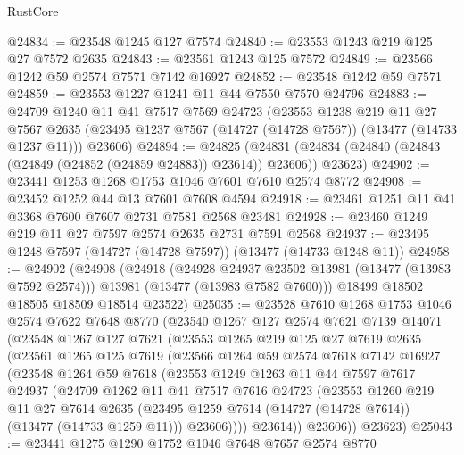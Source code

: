 \begin{lexlean}{RustCore}
\begin{coremodule}
@24834 := @23548 @1245 @127 @7574
@24840 := @23553 @1243 @219 @125 @27 @7572 @2635
@24843 := @23561 @1243 @125 @7572
@24849 := @23566 @1242 @59 @2574 @7571 @7142 @16927
@24852 := @23548 @1242 @59 @7571
@24859 := @23553 @1227 @1241 @11 @44 @7550 @7570 @24796
@24883 := @24709
    @1240
    @11
    @41
    @7517
    @7569
    @24723
    (@23553
      @1238
      @219
      @11
      @27
      @7567
      @2635
      (@23495 @1237 @7567 (@14727 (@14728 @7567)) (@13477 (@14733 @1237 @11)))
      @23606)
@24894 := @24825
    (@24831 (@24834 (@24840 (@24843 (@24849 (@24852 (@24859 @24883)) @23614)) @23606)) @23623)
@24902 := @23441 @1253 @1268 @1753 @1046 @7601 @7610 @2574 @8772
@24908 := @23452 @1252 @44 @13 @7601 @7608 @4594
@24918 := @23461 @1251 @11 @41 @3368 @7600 @7607 @2731 @7581 @2568 @23481
@24928 := @23460 @1249 @219 @11 @27 @7597 @2574 @2635 @2731 @7591 @2568
@24937 := @23495 @1248 @7597 (@14727 (@14728 @7597)) (@13477 (@14733 @1248 @11))
@24958 := @24902
    (@24908
      (@24918
        (@24928 @24937 @23502 @13981 (@13477 (@13983 @7592 @2574)))
        @13981
        (@13477 (@13983 @7582 @7600)))
      @18499
      @18502
      @18505
      @18509
      @18514
      @23522)
@25035 := @23528
    @7610
    @1268
    @1753
    @1046
    @2574
    @7622
    @7648
    @8770
    (@23540
      @1267
      @127
      @2574
      @7621
      @7139
      @14071
      (@23548
        @1267
        @127
        @7621
        (@23553
          @1265
          @219
          @125
          @27
          @7619
          @2635
          (@23561
            @1265
            @125
            @7619
            (@23566
              @1264
              @59
              @2574
              @7618
              @7142
              @16927
              (@23548
                @1264
                @59
                @7618
                (@23553
                  @1249
                  @1263
                  @11
                  @44
                  @7597
                  @7617
                  @24937
                  (@24709
                    @1262
                    @11
                    @41
                    @7517
                    @7616
                    @24723
                    (@23553
                      @1260
                      @219
                      @11
                      @27
                      @7614
                      @2635
                      (@23495 @1259 @7614 (@14727 (@14728 @7614)) (@13477 (@14733 @1259 @11)))
                      @23606))))
              @23614))
          @23606))
      @23623)
@25043 := @23441 @1275 @1290 @1752 @1046 @7648 @7657 @2574 @8770

\end{coremodule}
\end{lexlean}
